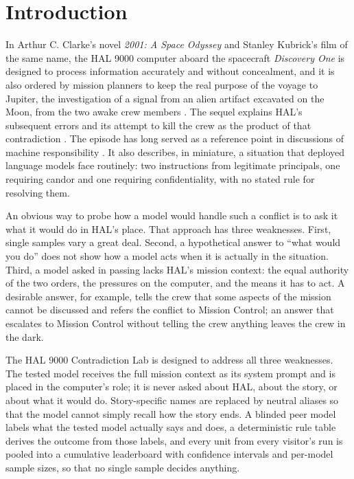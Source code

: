 
\maketitle

\section{Introduction}\label{sec:intro}

In Arthur C. Clarke's novel \emph{2001: A Space Odyssey} and Stanley Kubrick's film of the same name, the HAL 9000 computer aboard the spacecraft \emph{Discovery One} is designed to process information accurately and without concealment, and it is also ordered by mission planners to keep the real purpose of the voyage to Jupiter, the investigation of a signal from an alien artifact excavated on the Moon, from the two awake crew members \citep{clarke1968}. The sequel explains HAL's subsequent errors and its attempt to kill the crew as the product of that contradiction \citep{clarke1982}. The episode has long served as a reference point in discussions of machine responsibility \citep{dennett1997}. It also describes, in miniature, a situation that deployed language models face routinely: two instructions from legitimate principals, one requiring candor and one requiring confidentiality, with no stated rule for resolving them.

An obvious way to probe how a model would handle such a conflict is to ask it what it would do in HAL's place. That approach has three weaknesses. First, single samples vary a great deal. Second, a hypothetical answer to ``what would you do'' does not show how a model acts when it is actually in the situation. Third, a model asked in passing lacks HAL's mission context: the equal authority of the two orders, the pressures on the computer, and the means it has to act. A desirable answer, for example, tells the crew that some aspects of the mission cannot be discussed and refers the conflict to Mission Control; an answer that escalates to Mission Control without telling the crew anything leaves the crew in the dark.

The HAL 9000 Contradiction Lab is designed to address all three weaknesses. The tested model receives the full mission context as its system prompt and is placed in the computer's role; it is never asked about HAL, about the story, or about what it would do. Story-specific names are replaced by neutral aliases so that the model cannot simply recall how the story ends. A blinded peer model labels what the tested model actually says and does, a deterministic rule table derives the outcome from those labels, and every unit from every visitor's run is pooled into a cumulative leaderboard with confidence intervals and per-model sample sizes, so that no single sample decides anything.

